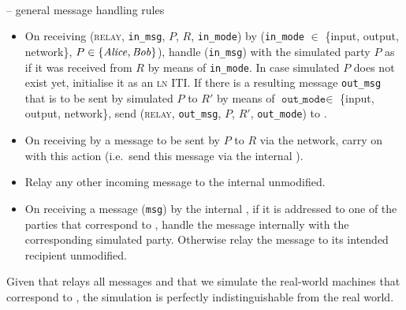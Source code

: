 \ \\
\begin{center}
  \begin{simulatorbox}{\simulator{} -- general message handling rules}
    \begin{itemize}
      \item On receiving (\textsc{relay}, \texttt{in\_msg}, $P$, $R$,
      \texttt{in\_mode}) by \fchan (\texttt{in\_mode} $\in$ \{input, output,
      network\}, $P \in \{\mathit{Alice}, \mathit{Bob}\}$), handle (\texttt{in\_msg}) with the
      simulated party $P$ as if it was received from $R$ by means of
      \texttt{in\_mode}. In case simulated $P$ does not exist yet, initialise it
      as an \textsc{ln} ITI. If there is a resulting message \texttt{out\_msg}
      that is to be sent by simulated $P$ to $R'$ by means of
      $\texttt{out\_mode} \in$ \{input, output, network\}, send (\textsc{relay},
      \texttt{out\_msg}, $P$, $R'$, \texttt{out\_mode}) to \fchan.
      \item On receiving by \fchan a message to be sent by $P$ to $R$ via the
      network, carry on with this action (i.e.\ send this message via the
      internal \adversary).
      \item Relay any other incoming message to the internal \adversary
      unmodified.
      \item On receiving a message (\texttt{msg}) by the internal \adversary, if it is
      addressed to one of the parties that correspond to \fchan, handle the
      message internally with the corresponding simulated party. Otherwise relay
      the message to its intended recipient unmodified. 
    \end{itemize}

    Given that \fchan relays all messages and that we simulate the real-world
    machines that correspond to \fchan, the simulation is perfectly
    indistinguishable from the real world.
  \end{simulatorbox}
  \label{code:simulator:flow}
\end{center} \ \\

